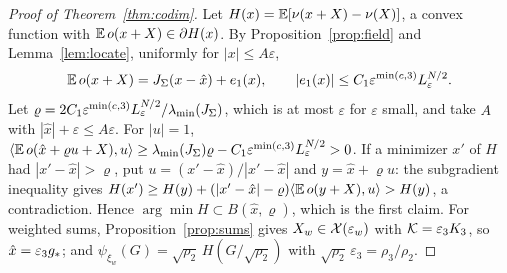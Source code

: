 \begin{proof}[Proof of Theorem~\ref{thm:codim}]
Let $H(x)=\mathbb{E}[\nu(x+X)-\nu(X)]$, a convex function with $\mathbb{E}\,o(x+X)\in\partial H(x)$. By Proposition~\ref{prop:field}
and Lemma~\ref{lem:locate}, uniformly for $|x|\le A\varepsilon$,
\[
\mathbb{E}\,o(x+X)=J_\Sigma(x-\hat x)+e_1(x),\qquad|e_1(x)|\le C_1\varepsilon^{\min(c,3)}L_\varepsilon^{N/2}.
\]
Let $\varrho=2C_1\varepsilon^{\min(c,3)}L_\varepsilon^{N/2}/\lambda_{\min}(J_\Sigma)$, which is at most $\varepsilon$ for
$\varepsilon$ small, and take $A$ with $|\hat x|+\varepsilon\le A\varepsilon$. For $|u|=1$,
$\langle \mathbb{E}\,o(\hat x+\varrho u+X), u\rangle\ge\lambda_{\min}(J_\Sigma)\varrho-C_1\varepsilon^{\min(c,3)}L_\varepsilon^{N/2}>0$. If a minimizer
$x'$ of $H$ had $|x'-\hat x|>\varrho$, put $u=(x'-\hat x)/|x'-\hat x|$ and $y=\hat x+\varrho u$: the subgradient
inequality gives $H(x')\ge H(y)+(|x'-\hat x|-\varrho)\langle \mathbb{E}\,o(y+X), u\rangle>H(y)$, a contradiction. Hence
$\arg\min H\subset B(\hat x,\varrho)$, which is the first claim. For weighted sums, Proposition~\ref{prop:sums} gives
$X_w\in\mathcal X(\varepsilon_w)$ with $\mathcal{K}=\varepsilon_3K_3$, so $\hat x=\varepsilon_3g_\ast$; and
$\psi_{\xi_w}(G)=\sqrt{\rho_2}\,H(G/\sqrt{\rho_2})$ with $\sqrt{\rho_2}\,\varepsilon_3=\rho_3/\rho_2$.
\end{proof}
